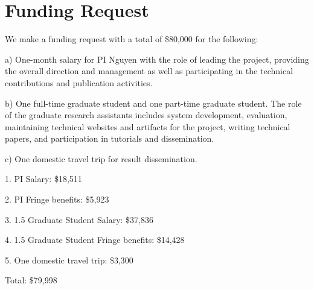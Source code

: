 \section{Funding Request}

We make a funding request with a total of \$80,000 for the following:

a) One-month salary for PI Nguyen with the role of leading the project, providing the overall direction and management as well as participating in the technical contributions and publication activities.

b) One full-time graduate student and one part-time graduate student. The role of the graduate research assistants includes system development, evaluation, maintaining technical websites and artifacts for the project, writing technical papers, and participation in tutorials and dissemination.

c) One domestic travel trip for result dissemination.

1. PI Salary: \$18,511

2. PI Fringe benefits: \$5,923

3. 1.5 Graduate Student Salary: \$37,836

4. 1.5 Graduate Student Fringe benefits: \$14,428

5. One domestic travel trip: \$3,300

Total: \$79,998



